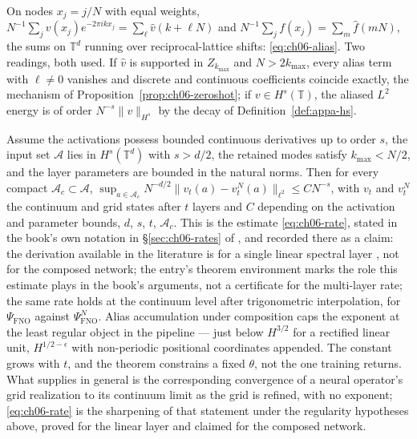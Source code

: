 \begin{proposition}\label{prop:appa-alias}
On nodes $x_j = j/N$ with equal weights,
$N^{-1}\sum_j v(x_j) e^{-2\pi i k x_j} = \sum_{\ell} \hat{v}(k + \ell N)$ and
$N^{-1}\sum_j f(x_j) = \sum_m \hat{f}(mN)$, the sums on $\mathbb{T}^d$ running over
reciprocal-lattice shifts: \eqref{eq:ch06-alias}. Two readings, both used. If $\hat{v}$ is
supported in $Z_{k_{\max}}$ and $N > 2k_{\max}$, every alias term with $\ell \ne 0$ vanishes
and discrete and continuous coefficients coincide exactly, the mechanism of
Proposition~\ref{prop:ch06-zeroshot}; if $v \in H^s(\mathbb{T})$, the aliased $L^2$ energy is
of order $N^{-s}\|v\|_{H^s}$ by the decay of Definition~\ref{def:appa-hs}.
\end{proposition}

\begin{theorem}\label{thm:appa-discretization}
Assume the activations possess bounded continuous derivatives up to order $s$, the input set
$\mathcal{A}$ lies in $H^s(\mathbb{T}^d)$ with $s > d/2$, the retained modes satisfy
$k_{\max} < N/2$, and the layer parameters are bounded in the natural norms. Then for every
compact $\mathcal{A}_c \subset \mathcal{A}$, $\sup_{a \in \mathcal{A}_c}
N^{-d/2}\|v_t(a) - v_t^N(a)\|_{\ell^2} \le C N^{-s}$, with $v_t$ and $v_t^N$ the continuum and
grid states after $t$ layers and $C$ depending on the activation and parameter bounds, $d$,
$s$, $t$, $\mathcal{A}_c$. This is the estimate \eqref{eq:ch06-rate}, stated in the
book's own notation in \S\ref{sec:ch06-rates} of
, and recorded there as a claim:
the derivation available in the literature is for a single linear spectral layer
\cite{subedi2024controlling}, not for the composed network; the entry's theorem environment
marks the role this estimate plays in the book's arguments, not a certificate for the
multi-layer rate; the same rate holds at the
continuum level after trigonometric interpolation, for $\Psi_{\text{FNO}}$ against
$\Psi_{\text{FNO}}^N$. Alias accumulation under composition caps the exponent at the least
regular object in the pipeline --- just below $H^{3/2}$ for a rectified linear unit,
$H^{1/2-\epsilon}$ with non-periodic positional coordinates appended. The constant grows with
$t$, and the theorem constrains a fixed $\theta$, not the one training returns. What
\cite{kovachki2023neural} supplies in general is the corresponding convergence of a neural
operator's grid realization to its continuum limit as the grid is refined, with no exponent;
\eqref{eq:ch06-rate} is the sharpening of that statement under the regularity hypotheses
above, proved for the linear layer and claimed for the composed network.
\end{theorem}

